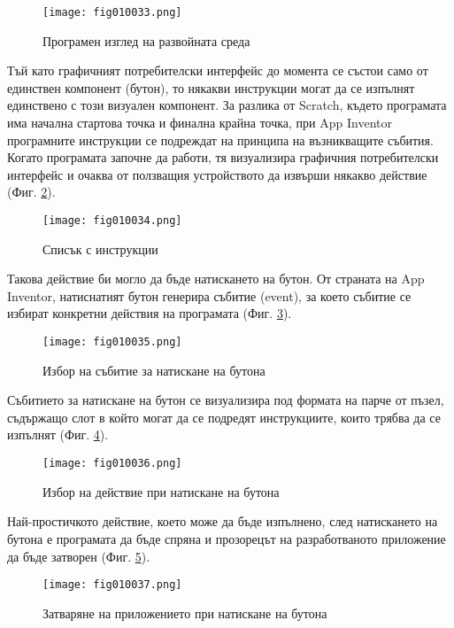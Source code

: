 \begin{figure}[H]
  \centering
  \texttt{[image: fig010033.png]}
  \caption{Програмен изглед на развойната среда}
\label{fig010033}
\end{figure}

Тъй като графичният потребителски интерфейс до момента се състои само от единствен компонент (бутон), то някакви инструкции могат да се изпълнят единствено с този визуален компонент. За разлика от Scratch, където програмата има начална стартова точка и финална крайна точка, при App Inventor програмните инструкции се подреждат на принципа на възникващите събития. Когато програмата започне да работи, тя визуализира графичния потребителски интерфейс и очаква от ползващия устройството да извърши някакво действие (Фиг. \ref{fig010034}). 

\begin{figure}[H]
  \centering
  \texttt{[image: fig010034.png]}
  \caption{Списък с инструкции}
\label{fig010034}
\end{figure}

Такова действие би могло да бъде натискането на бутон. От страната на App Inventor, натиснатият бутон генерира събитие (event), за което събитие се избират конкретни действия на програмата (Фиг. \ref{fig010035}). 

\begin{figure}[H]
  \centering
  \texttt{[image: fig010035.png]}
  \caption{Избор на събитие за натискане на бутона}
\label{fig010035}
\end{figure}

Събитието за натискане на бутон се визуализира под формата на парче от пъзел, съдържащо слот в който могат да се подредят инструкциите, които трябва да се изпълнят (Фиг. \ref{fig010036}).

\begin{figure}[H]
  \centering
  \texttt{[image: fig010036.png]}
  \caption{Избор на действие при натискане на бутона}
\label{fig010036}
\end{figure}

Най-простичкото действие, което може да бъде изпълнено, след натискането на бутона е програмата да бъде спряна и прозорецът на разработваното приложение да бъде затворен (Фиг. \ref{fig010037}).

\begin{figure}[H]
  \centering
  \texttt{[image: fig010037.png]}
  \caption{Затваряне на приложението при натискане на бутона}
\label{fig010037}
\end{figure}

